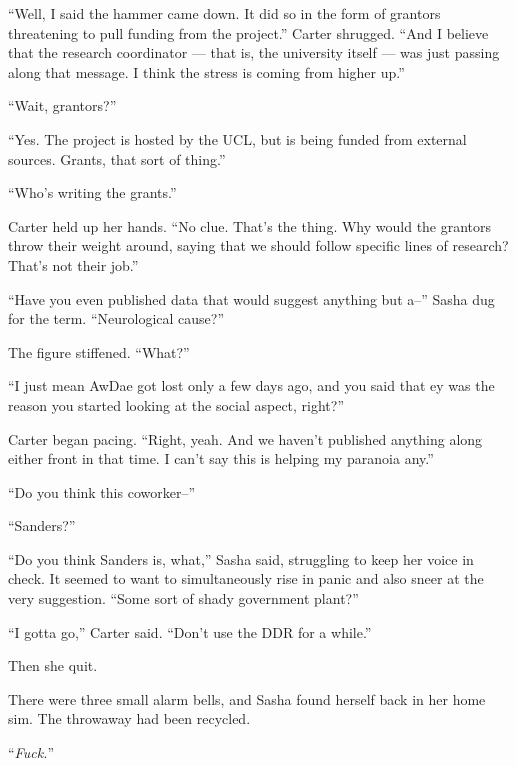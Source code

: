 ``Well, I said the hammer came down. It did so in the form of grantors threatening to pull funding from the project.'' Carter shrugged. ``And I believe that the research coordinator --- that is, the university itself --- was just passing along that message. I think the stress is coming from higher up.''

``Wait, grantors?''

``Yes. The project is hosted by the UCL, but is being funded from external sources. Grants, that sort of thing.''

``Who's writing the grants.''

Carter held up her hands. ``No clue. That's the thing. Why would the grantors throw their weight around, saying that we should follow specific lines of research? That's not their job.''

``Have you even published data that would suggest anything but a--'' Sasha dug for the term. ``Neurological cause?''

The figure stiffened. ``What?''

``I just mean AwDae got lost only a few days ago, and you said that ey was the reason you started looking at the social aspect, right?''

Carter began pacing. ``Right, yeah. And we haven't published anything along either front in that time. I can't say this is helping my paranoia any.''

``Do you think this coworker--''

``Sanders?''

``Do you think Sanders is, what,'' Sasha said, struggling to keep her voice in check. It seemed to want to simultaneously rise in panic and also sneer at the very suggestion. ``Some sort of shady government plant?''

``I gotta go,'' Carter said. ``Don't use the DDR for a while.''

Then she quit.

There were three small alarm bells, and Sasha found herself back in her home sim. The throwaway had been recycled.

``\emph{Fuck.}''
